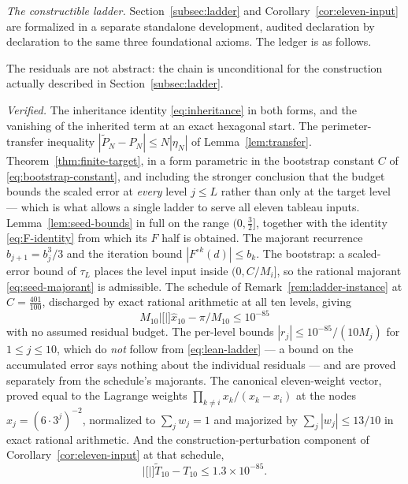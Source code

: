 \documentclass[12pt]{article}
\theoremstyle{definition}
\theoremstyle{remark}
\newcommand{\abs}[1]{\left|#1\right|}
\begin{document}
\emph{The constructible ladder.}  Section~\ref{subsec:ladder} and
Corollary~\ref{cor:eleven-input} are formalized in a separate standalone
development, audited declaration by declaration to the same three foundational
axioms.  The ledger is as follows.

The residuals are not abstract: the chain is unconditional for the construction
actually described in Section~\ref{subsec:ladder}.

\emph{Verified.}  The inheritance identity \eqref{eq:inheritance} in both forms,
and the vanishing of the inherited term at an exact hexagonal start.  The
perimeter-transfer inequality $\abs{\widetilde P_N-P_N}\le N\abs{\eta_N}$ of
Lemma~\ref{lem:transfer}.  Theorem~\ref{thm:finite-target}, in a form parametric
in the bootstrap constant $C$ of \eqref{eq:bootstrap-constant}, and including
the stronger conclusion that the budget bounds the scaled error at \emph{every}
level $j\le L$ rather than only at the target level --- which is what allows a
single ladder to serve all eleven tableau inputs.  Lemma~\ref{lem:seed-bounds}
in full on the range $(0,\tfrac32]$, together with the identity
\eqref{eq:F-identity} from which its $F$ half is obtained.  The majorant
recurrence $b_{j+1}=b_j^3/3$ and the iteration bound
$\abs{F^{\circ k}(d)}\le b_k$.  The bootstrap: a scaled-error bound of $\tau_L$
places the level input inside $(0,C/M_i]$, so the rational majorant
\eqref{eq:seed-majorant} is admissible.  The schedule of
Remark~\ref{rem:ladder-instance} at $C=\tfrac{401}{100}$, discharged by exact
rational arithmetic at all ten levels, giving
\begin{equation}
  M_{10}\abs[\big]{\widehat x_{10}-\pi/M_{10}}\le10^{-85}
  \label{eq:lean-ladder}
\end{equation}
with no assumed residual budget.  The per-level bounds
$\abs{r_j}\le10^{-85}/(10M_j)$ for $1\le j\le10$, which do \emph{not} follow
from \eqref{eq:lean-ladder} --- a bound on the accumulated error says nothing
about the individual residuals --- and are proved separately from the schedule's
majorants.  The canonical eleven-weight vector, proved equal to the Lagrange
weights $\prod_{k\ne i}x_k/(x_k-x_i)$ at the nodes $x_j=(6\cdot3^j)^{-2}$,
normalized to $\sum_jw_j=1$ and majorized by $\sum_j\abs{w_j}\le13/10$ in exact
rational arithmetic.  And the construction-perturbation component of
Corollary~\ref{cor:eleven-input} at that schedule,
\begin{equation}
  \abs[\big]{\widetilde T_{10}-T_{10}}\le1.3\times10^{-85}.
  \label{eq:lean-tableau}
\end{equation}
\end{document}
